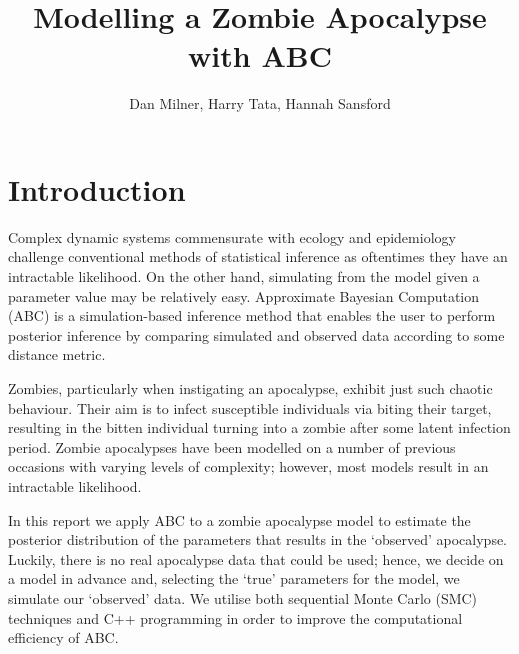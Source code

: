 \documentclass[]{article}
\title{Modelling a Zombie Apocalypse with ABC}
\author{Dan Milner, Harry Tata, Hannah Sansford}
\begin{document}

\maketitle

\section{Introduction}
Complex dynamic systems commensurate with ecology and epidemiology challenge conventional methods of statistical inference as oftentimes they have an intractable likelihood. On the other hand, simulating from the model given a parameter value may be relatively easy. Approximate Bayesian Computation (ABC) is a simulation-based inference method that enables the user to perform posterior inference by comparing simulated and observed data according to some distance metric.


Zombies, particularly when instigating an apocalypse, exhibit just such chaotic behaviour. Their aim is to infect susceptible individuals via biting their target, resulting in the bitten individual turning into a zombie after some latent infection period. Zombie apocalypses have been modelled on a number of previous occasions with varying levels of complexity; however, most models result in an intractable likelihood.


In this report we apply ABC to a zombie apocalypse model to estimate the posterior distribution of the parameters that results in the `observed' apocalypse. Luckily, there is no real apocalypse data that could be used; hence, we decide on a model in advance and, selecting the `true' parameters for the model, we simulate our `observed' data. We utilise both sequential Monte Carlo (SMC) techniques and C++ programming in order to improve the computational efficiency of ABC.
\end{document}
